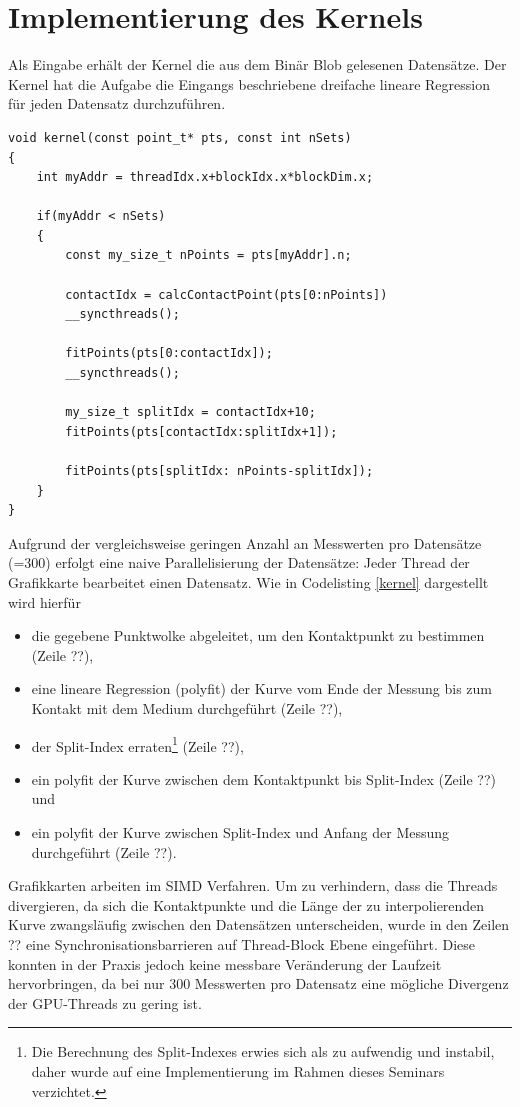 \section{Implementierung des Kernels}
Als Eingabe erhält der Kernel die aus dem Binär Blob gelesenen Datensätze.
Der Kernel hat die Aufgabe die Eingangs beschriebene dreifache lineare Regression für jeden Datensatz durchzuführen.

\begin{lstlisting}[caption=Implementierung des Kernel in Pseudocode,label=kernel]
void kernel(const point_t* pts, const int nSets)
{
    int myAddr = threadIdx.x+blockIdx.x*blockDim.x;

    if(myAddr < nSets)
    {
        const my_size_t nPoints = pts[myAddr].n;

        contactIdx = calcContactPoint(pts[0:nPoints])
        __syncthreads();

        fitPoints(pts[0:contactIdx]);
        __syncthreads();
                
        my_size_t splitIdx = contactIdx+10;
        fitPoints(pts[contactIdx:splitIdx+1]);

        fitPoints(pts[splitIdx: nPoints-splitIdx]);
    }
}
\end{lstlisting}


Aufgrund der vergleichsweise geringen Anzahl an Messwerten pro Datensätze (=300) erfolgt eine naive Parallelisierung der Datensätze: Jeder Thread der Grafikkarte bearbeitet einen Datensatz. Wie in Codelisting \ref{kernel} dargestellt wird hierfür

\begin{itemize}
\item die gegebene Punktwolke abgeleitet, um den Kontaktpunkt zu bestimmen (Zeile ??),
\item eine lineare Regression (polyfit) der Kurve vom Ende der Messung bis zum Kontakt mit dem Medium durchgeführt (Zeile ??),
\item der Split-Index erraten\footnote{Die Berechnung des Split-Indexes erwies sich als zu aufwendig und instabil, daher wurde auf eine Implementierung im Rahmen dieses Seminars verzichtet.} (Zeile ??),
\item ein polyfit der Kurve zwischen dem Kontaktpunkt bis Split-Index  (Zeile ??) und
\item ein polyfit der Kurve zwischen Split-Index und Anfang der Messung durchgeführt  (Zeile ??).
\end{itemize}

Grafikkarten arbeiten im SIMD Verfahren. Um zu verhindern, dass die Threads divergieren, da sich die Kontaktpunkte und die Länge der zu interpolierenden Kurve zwangsläufig zwischen den Datensätzen unterscheiden, wurde in den Zeilen ?? eine Synchronisationsbarrieren auf Thread-Block Ebene eingeführt.
Diese konnten in der Praxis jedoch keine messbare Veränderung der Laufzeit hervorbringen, da bei nur 300 Messwerten pro Datensatz eine mögliche Divergenz der GPU-Threads zu gering ist.

